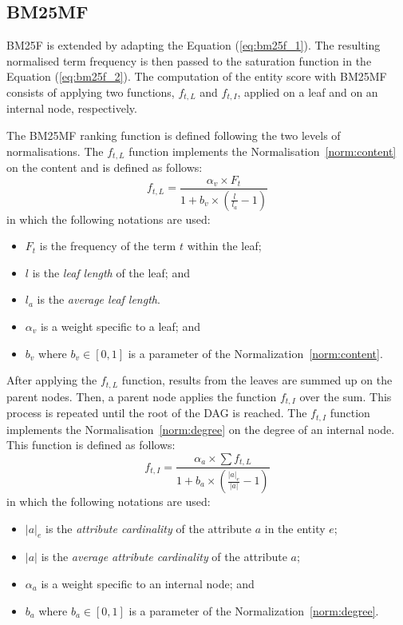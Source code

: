 \subsection{BM25MF}

BM25F is extended by adapting the Equation (\ref{eq:bm25f_1}). The resulting normalised term frequency is then passed to the saturation function in the Equation (\ref{eq:bm25f_2}).
The computation of the entity score with BM25MF consists of applying two functions, $f_{t,L}$ and $f_{t,I}$, applied on a leaf and on an internal node, respectively.

The BM25MF ranking function is defined following the two levels of normalisations.
The $f_{t,L}$ function implements the Normalisation~\ref{norm:content} on the content and is defined as follows:
$$
\label{bm25mf_v}
f_{t,L} = \frac{\alpha_v\times F_t}{1+b_v\times\left(\frac{l}{l_a}-1\right)}
$$
in which the following notations are used:
\begin{itemize}
	\item $F_t$ is the frequency of the term $t$ within the leaf;
	\item $l$ is the \emph{leaf length} of the leaf; and
	\item $l_a$ is the \emph{average leaf length}.
	\item $\alpha_v$ is a weight specific to a leaf; and
	\item $b_v$ where $b_v \in \left[0,1\right]$ is a parameter of the Normalization~\ref{norm:content}.
\end{itemize}

After applying the $f_{t,L}$ function, results from the leaves are summed up on the parent nodes. Then, a parent node applies the function $f_{t,I}$ over the sum. This process is repeated until the root of the DAG is reached. The $f_{t,I}$ function implements the Normalisation~\ref{norm:degree} on the degree of an internal node. This function is defined as follows:
$$
\label{bm25mf_a}
f_{t,I} = \frac{\alpha_a \times \sum{f_{t,L}} }{ 1 + b_a \times \left(\frac{ \left|{a}\right|_e }{ \left|{a}\right| } - 1\right) }
$$
in which the following notations are used:
\begin{itemize}
\item $\left|{a}\right|_e$ is the \emph{attribute cardinality} of the attribute $a$ in the entity $e$;
\item $\left|{a}\right|$ is the \emph{average attribute cardinality} of the attribute $a$;
\item $\alpha_a$ is a weight specific to an internal node; and
\item $b_a$ where $b_a \in \left[0,1\right]$ is a parameter of the Normalization~\ref{norm:degree}.
\end{itemize}

